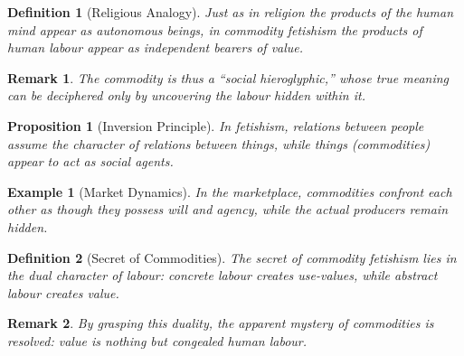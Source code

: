\documentclass{article}
\newtheorem{innerdef}{Definition}
\newtheorem{innerprop}{Proposition}
\newtheorem{innerex}{Example}
\newtheorem{innerremark}{Remark}
\newenvironment{definition}{\begin{innerdef}}{\end{innerdef}}
\newenvironment{proposition}{\begin{innerprop}}{\end{innerprop}}
\newenvironment{example}{\begin{innerex}}{\end{innerex}}
\newenvironment{remark}{\begin{innerremark}}{\end{innerremark}}
\begin{document}
\begin{definition}[Religious Analogy]
Just as in religion the products of the human mind appear as autonomous 
beings, in commodity fetishism the products of human labour appear as 
independent bearers of value.
\end{definition}

\begin{remark}
The commodity is thus a “social hieroglyphic,” whose true meaning can be 
deciphered only by uncovering the labour hidden within it.
\end{remark}

\begin{proposition}[Inversion Principle]
In fetishism, relations between people assume the character of relations 
between things, while things (commodities) appear to act as social agents.
\end{proposition}

\begin{example}[Market Dynamics]
In the marketplace, commodities confront each other as though they 
possess will and agency, while the actual producers remain hidden.
\end{example}

\begin{definition}[Secret of Commodities]
The secret of commodity fetishism lies in the dual character of labour: 
concrete labour creates use-values, while abstract labour creates value.
\end{definition}

\begin{remark}
By grasping this duality, the apparent mystery of commodities is resolved: 
value is nothing but congealed human labour.
\end{remark}
\end{document}
